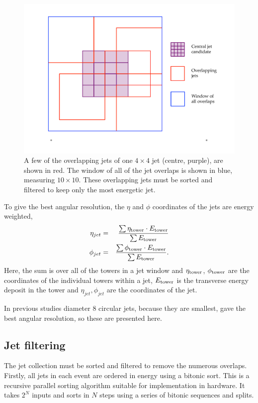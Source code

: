 \begin{figure}[ht!]
\begin{center}
  \includegraphics[scale=0.37]{Figures/l1jets/jetoverlaps}
\caption{A few of the overlapping jets of one $4\times4$ jet (centre, purple), are shown in red. The window of all of the jet overlaps is shown in blue, measuring $10\times10$. These overlapping jets must be sorted and filtered to keep only the most energetic jet.}
\label{slide}
\end{center}
\end{figure}

To give the best angular resolution, the $\eta$ and $\phi$ coordinates of the jets are energy weighted,
\begin{eqnarray}
\eta_{jet} &=& \frac{\sum{\eta_{\rm tower} \cdot E_{\rm tower}} } {\sum{ E_{\rm tower} } }  \\
\phi_{jet} &=& \frac{\sum{\phi_{\rm tower} \cdot E_{\rm tower}} } {\sum{ E_{\rm tower} } } . 
\end{eqnarray}
Here, the sum is over all of the towers in a jet window and $\eta_{\rm tower}$, $\phi_{\rm tower}$ are the coordinates of the individual towers within a jet, $E_{\rm tower}$ is the transverse energy deposit in the tower and $\eta_{jet}, \phi_{jet}$ are the coordinates of the jet.


In  previous studies diameter 8 circular jets, because they are smallest, gave the best angular resolution, so these are presented here. 



\subsection{Jet filtering} 
The jet collection must be sorted and filtered to remove the numerous overlaps.
Firstly, all jets in each event are ordered in energy using a bitonic sort.
This is a recursive parallel sorting algorithm suitable for implementation in hardware.
It takes $2^N$ inputs and sorts in $N$ steps using a series of bitonic sequences and splits.

